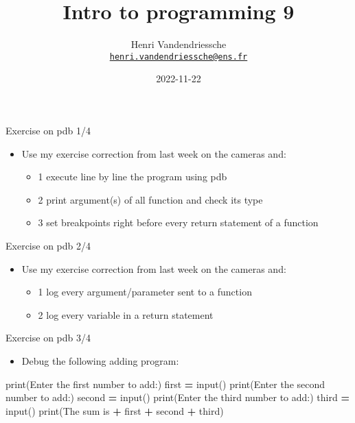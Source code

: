 \documentclass[
  8pt,
  ignorenonframetext,
]{beamer}
\title{Intro to programming 9}
\author{Henri Vandendriessche\\
\href{mailto:henri.vandendriessche@ens.fr}{\nolinkurl{henri.vandendriessche@ens.fr}}}
\date{2022-11-22}
\newenvironment{Shaded}{\begin{snugshade}}{\end{snugshade}}
\newcommand{\BuiltInTok}[1]{#1}
\newcommand{\NormalTok}[1]{#1}
\newcommand{\OperatorTok}[1]{\textcolor[rgb]{0.81,0.36,0.00}{\textbf{#1}}}
\newcommand{\StringTok}[1]{\textcolor[rgb]{0.31,0.60,0.02}{#1}}
\providecommand{\tightlist}{%
  \setlength{\itemsep}{0pt}\setlength{\parskip}{0pt}}
\begin{document}
\frame{\titlepage}

\begin{frame}{Exercise on pdb 1/4}
\protect\hypertarget{exercise-on-pdb-14}{}
\begin{itemize}
\tightlist
\item
  Use my exercise correction from last week on the cameras and:

  \begin{itemize}
  \tightlist
  \item
    1 execute line by line the program using pdb
  \item
    2 print argument(s) of all function and check its type
  \item
    3 set breakpoints right before every return statement of a function
  \end{itemize}
\end{itemize}
\end{frame}

\begin{frame}{Exercise on pdb 2/4}
\protect\hypertarget{exercise-on-pdb-24}{}
\begin{itemize}
\tightlist
\item
  Use my exercise correction from last week on the cameras and:

  \begin{itemize}
  \tightlist
  \item
    1 log every argument/parameter sent to a function
  \item
    2 log every variable in a return statement
  \end{itemize}
\end{itemize}
\end{frame}

\begin{frame}[fragile]{Exercise on pdb 3/4}
\protect\hypertarget{exercise-on-pdb-34}{}
\begin{itemize}
\tightlist
\item
  Debug the following adding program:
\end{itemize}

\begin{Shaded}
\begin{Highlighting}[]
\BuiltInTok{print}\NormalTok{(}\StringTok{\textquotesingle{}Enter the first number to add:\textquotesingle{}}\NormalTok{)}
\NormalTok{first }\OperatorTok{=} \BuiltInTok{input}\NormalTok{()}
\BuiltInTok{print}\NormalTok{(}\StringTok{\textquotesingle{}Enter the second number to add:\textquotesingle{}}\NormalTok{)}
\NormalTok{second }\OperatorTok{=} \BuiltInTok{input}\NormalTok{()}
\BuiltInTok{print}\NormalTok{(}\StringTok{\textquotesingle{}Enter the third number to add:\textquotesingle{}}\NormalTok{)}
\NormalTok{third }\OperatorTok{=} \BuiltInTok{input}\NormalTok{()}
\BuiltInTok{print}\NormalTok{(}\StringTok{\textquotesingle{}The sum is \textquotesingle{}} \OperatorTok{+}\NormalTok{ first }\OperatorTok{+}\NormalTok{ second }\OperatorTok{+}\NormalTok{ third)}
\end{Highlighting}
\end{Shaded}
\end{frame}
\end{document}

